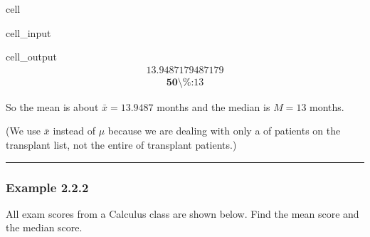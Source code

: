 \documentclass[letterpaper,10pt,english]{jupyterBook}
\begin{document}
\begin{sphinxuseclass}{cell}
\begin{sphinxVerbatimInput}
\begin{sphinxuseclass}{cell_input}
\end{sphinxuseclass}\end{sphinxVerbatimInput}
\begin{sphinxVerbatimOutput}

\begin{sphinxuseclass}{cell_output}\begin{equation*}
\begin{split}13.9487179487179\end{split}
\end{equation*}\begin{equation*}
\begin{split}\textbf{50\textbackslash{}\%:} 13\end{split}
\end{equation*}
\end{sphinxuseclass}\end{sphinxVerbatimOutput}

\end{sphinxuseclass}
\sphinxAtStartPar
So the mean is about \(\bar{x} = 13.9487\) months and the median is \(M = 13\) months.

\sphinxAtStartPar
(We use \(\bar{x}\) instead of \(\mu\) because we are dealing with only a  of patients on the transplant list, not the entire  of transplant patients.)


\bigskip\hrule\bigskip



\subsubsection{Example 2.2.2}
\label{\detokenize{Ch2 Descriptive Statistics/2.2 Measures of Central Tendency:example-2-2-2}}
\sphinxAtStartPar
All exam scores from a Calculus class are shown below. Find the mean score and the median score.
\end{document}
